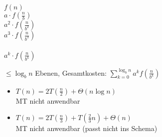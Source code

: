 \begin{itemize}
\begin{center}
        \vline
        \begin{minipage}{0.3\textwidth}
            \centering
            $f(n)$ \\[0.3cm]
            $a \cdot f\left(\frac{n}{b}\right)$ \\[0.3cm]
            $a^2 \cdot f\left(\frac{n}{b^2}\right)$ \\[0.3cm]
            $a^3 \cdot f\left(\frac{n}{b^3}\right)$ \\[0.3cm]
            \hspace{0cm} \\[0.3cm]
            $a^k \cdot f\left(\frac{n}{b^k}\right)$ \\[0.3cm]
        \end{minipage}
        \end{center}
        $\leq \log_b n$ Ebenen, Gesamtkosten: $\sum\limits_{k = 0}^{\log_b n} a^k f\left(\frac{n}{b^k}\right)$\\
        \begin{itemize}
        \item   $T(n) = 2 T \left(\frac{n}{2}\right) + \Theta(n \log n)$\\
                MT nicht anwendbar
        \item   $T(n) = 2 T \left(\frac{n}{3}\right) + T \left(\frac{2}{3} n\right) + \Theta(n)$\\
                MT nicht anwendbar (passt nicht ins Schema)
        \end{itemize}
\end{itemize}
